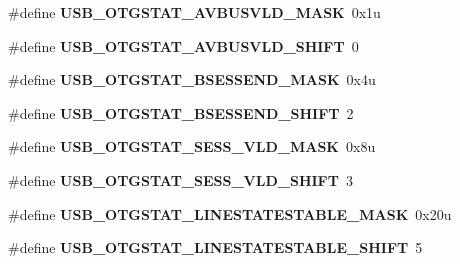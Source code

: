 \begin{DoxyCompactItemize}
\item 
\hypertarget{group___u_s_b___register___masks_gaad4e0319a6f42042472b52c8d1ec1c77}{}\#define {\bfseries U\+S\+B\+\_\+\+O\+T\+G\+S\+T\+A\+T\+\_\+\+A\+V\+B\+U\+S\+V\+L\+D\+\_\+\+M\+A\+S\+K}~0x1u\label{group___u_s_b___register___masks_gaad4e0319a6f42042472b52c8d1ec1c77}

\item 
\hypertarget{group___u_s_b___register___masks_ga66258b09ad8ec5462b8594ce5ac7384c}{}\#define {\bfseries U\+S\+B\+\_\+\+O\+T\+G\+S\+T\+A\+T\+\_\+\+A\+V\+B\+U\+S\+V\+L\+D\+\_\+\+S\+H\+I\+F\+T}~0\label{group___u_s_b___register___masks_ga66258b09ad8ec5462b8594ce5ac7384c}

\item 
\hypertarget{group___u_s_b___register___masks_gabcc7c3e58301a6abc07915a5deb92d39}{}\#define {\bfseries U\+S\+B\+\_\+\+O\+T\+G\+S\+T\+A\+T\+\_\+\+B\+S\+E\+S\+S\+E\+N\+D\+\_\+\+M\+A\+S\+K}~0x4u\label{group___u_s_b___register___masks_gabcc7c3e58301a6abc07915a5deb92d39}

\item 
\hypertarget{group___u_s_b___register___masks_ga6eb987e49a137057c02e8f2b26e61724}{}\#define {\bfseries U\+S\+B\+\_\+\+O\+T\+G\+S\+T\+A\+T\+\_\+\+B\+S\+E\+S\+S\+E\+N\+D\+\_\+\+S\+H\+I\+F\+T}~2\label{group___u_s_b___register___masks_ga6eb987e49a137057c02e8f2b26e61724}

\item 
\hypertarget{group___u_s_b___register___masks_ga9158e279053f0f684c33cba2ec1e68ee}{}\#define {\bfseries U\+S\+B\+\_\+\+O\+T\+G\+S\+T\+A\+T\+\_\+\+S\+E\+S\+S\+\_\+\+V\+L\+D\+\_\+\+M\+A\+S\+K}~0x8u\label{group___u_s_b___register___masks_ga9158e279053f0f684c33cba2ec1e68ee}

\item 
\hypertarget{group___u_s_b___register___masks_ga69ae55ac7a03104ed013c34efa24ef43}{}\#define {\bfseries U\+S\+B\+\_\+\+O\+T\+G\+S\+T\+A\+T\+\_\+\+S\+E\+S\+S\+\_\+\+V\+L\+D\+\_\+\+S\+H\+I\+F\+T}~3\label{group___u_s_b___register___masks_ga69ae55ac7a03104ed013c34efa24ef43}

\item 
\hypertarget{group___u_s_b___register___masks_ga217f22f350652ae8ad2502c2baf8440b}{}\#define {\bfseries U\+S\+B\+\_\+\+O\+T\+G\+S\+T\+A\+T\+\_\+\+L\+I\+N\+E\+S\+T\+A\+T\+E\+S\+T\+A\+B\+L\+E\+\_\+\+M\+A\+S\+K}~0x20u\label{group___u_s_b___register___masks_ga217f22f350652ae8ad2502c2baf8440b}

\item 
\hypertarget{group___u_s_b___register___masks_ga34e5a04fe2a6546a9b22a40dc1f7c543}{}\#define {\bfseries U\+S\+B\+\_\+\+O\+T\+G\+S\+T\+A\+T\+\_\+\+L\+I\+N\+E\+S\+T\+A\+T\+E\+S\+T\+A\+B\+L\+E\+\_\+\+S\+H\+I\+F\+T}~5\label{group___u_s_b___register___masks_ga34e5a04fe2a6546a9b22a40dc1f7c543}


\end{DoxyCompactItemize}
